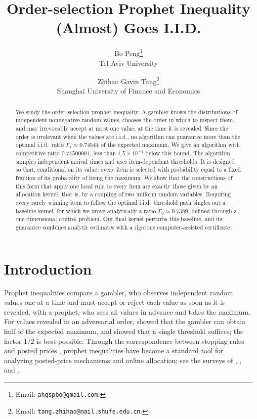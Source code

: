 \documentclass[11pt]{article}
\title{Order-selection Prophet Inequality (Almost) Goes I.I.D.}
\author{
  Bo Peng\thanks{Email: \texttt{ahqspbo@gmail.com}.}\\
  Tel Aviv University
  \and
  Zhihao Gavin Tang\thanks{Email:
    \texttt{tang.zhihao@mail.shufe.edu.cn}.}\\
  Shanghai University of Finance and Economics
}
\date{}
\theoremstyle{definition}
\theoremstyle{remark}
\begin{document}
\maketitle

\begin{abstract}
We study the order-selection prophet inequality. A gambler knows the distributions of
independent nonnegative random values, chooses the order in which to inspect them, and may
irrevocably accept at most one value, at the time it is revealed. Since the order is irrelevant when the
values are i.i.d., no algorithm can guarantee more than the optimal i.i.d.\ ratio
$\Gamma_\star\approx0.74544$ of the expected maximum. We give an algorithm with competitive
ratio $0.74500001$, less than $4.5\times10^{-4}$ below this bound. The algorithm samples
independent arrival times and uses item-dependent thresholds. It is designed so that,
conditional on its value, every item is selected with probability equal to a fixed fraction
of its probability of being the maximum. We show that the constructions of this form that
apply one local rule to every item are exactly those given by an allocation kernel, that is,
by a coupling of two uniform random variables. Requiring every rarely winning item to follow
the optimal i.i.d.\ threshold path singles out a baseline kernel, for which we prove
analytically a ratio $\Gamma_0\approx0.7389$, defined through a one-dimensional control
problem. Our final kernel perturbs this baseline, and its guarantee combines analytic
estimates with a rigorous computer-assisted certificate.
\end{abstract}

\section{Introduction}\label{sec:intro}

Prophet inequalities compare a gambler, who observes independent random values one at a
time and must accept or reject each value as soon as it is revealed, with a prophet, who
sees all values in advance and takes the maximum. For values revealed in an adversarial
order, \citet{KS77,KS78} showed that the gambler can obtain half of the expected maximum,
and \citet{SC84} showed that a single threshold suffices; the factor $1/2$ is best possible.
Through the correspondence between stopping rules and posted prices
\citep{HKS07,CHMS10,CFPV19}, prophet inequalities have become a standard tool for analyzing
posted-price mechanisms and online allocation; see the surveys of \citet{HK92},
\citet{Lucier17}, and \citet{CFHOV18}.
\end{document}
